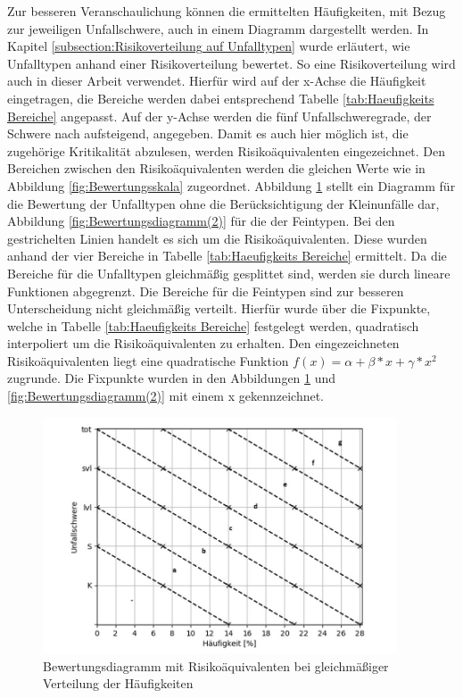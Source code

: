 Zur besseren Veranschaulichung können die ermittelten Häufigkeiten, mit Bezug zur jeweiligen Unfallschwere, auch in einem Diagramm dargestellt werden. In Kapitel \ref{subsection:Risikoverteilung auf Unfalltypen} wurde erläutert, wie \Textcite[S. 60]{Gschwendtner.2015} Unfalltypen anhand einer Risikoverteilung bewertet. So eine Risikoverteilung wird auch in dieser Arbeit verwendet. Hierfür wird auf der x-Achse die Häufigkeit eingetragen, die Bereiche werden dabei entsprechend Tabelle \ref{tab:Haeufigkeits Bereiche} angepasst. Auf der y-Achse werden die fünf Unfallschweregrade, der Schwere nach aufsteigend, angegeben. Damit es auch hier möglich ist, die zugehörige Kritikalität abzulesen, werden Risikoäquivalenten eingezeichnet. Den Bereichen zwischen den Risikoäquivalenten werden die gleichen Werte wie in Abbildung \ref{fig:Bewertungsskala} zugeordnet. Abbildung \ref{fig:Bewertungsdiagramm} stellt ein Diagramm für die Bewertung der Unfalltypen ohne die Berücksichtigung der Kleinunfälle dar, Abbildung \ref{fig:Bewertungsdiagramm(2)} für die der Feintypen. Bei den gestrichelten Linien handelt es sich um die Risikoäquivalenten. Diese wurden anhand der vier Bereiche in Tabelle \ref{tab:Haeufigkeits Bereiche} ermittelt. Da die Bereiche für die Unfalltypen gleichmäßig gesplittet sind, werden sie durch lineare Funktionen abgegrenzt. Die Bereiche für die Feintypen sind zur besseren Unterscheidung nicht gleichmäßig verteilt. Hierfür wurde über die Fixpunkte, welche in Tabelle \ref{tab:Haeufigkeits Bereiche} festgelegt werden, quadratisch interpoliert um die Risikoäquivalenten zu erhalten. Den eingezeichneten Risikoäquivalenten liegt eine quadratische Funktion $f(x) = \alpha + \beta*x + \gamma*x^{2}$ zugrunde. Die Fixpunkte wurden in den Abbildungen \ref{fig:Bewertungsdiagramm} und \ref{fig:Bewertungsdiagramm(2)} mit einem x gekennzeichnet. 

\begin{savenotes}
	\begin{figure}[H]
		\centering
		\includegraphics[width=10.5cm,height=7cm]{figures/Bewertungsdiagramm}
		\caption[Bewertungsdiagramm mit Risikoäquivalenten bei gleichmäßiger Verteilung der Häufigkeiten]{Bewertungsdiagramm mit Risikoäquivalenten bei gleichmäßiger Verteilung der Häufigkeiten}\label{fig:Bewertungsdiagramm}
	\end{figure}
\end{savenotes}

